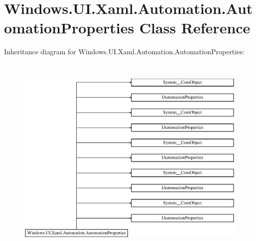 \hypertarget{class_windows_1_1_u_i_1_1_xaml_1_1_automation_1_1_automation_properties}{}\section{Windows.\+U\+I.\+Xaml.\+Automation.\+Automation\+Properties Class Reference}
\label{class_windows_1_1_u_i_1_1_xaml_1_1_automation_1_1_automation_properties}
Inheritance diagram for Windows.\+U\+I.\+Xaml.\+Automation.\+Automation\+Properties\+:\begin{figure}[H]
\begin{center}
\leavevmode
\includegraphics[height=10.032573cm]{class_windows_1_1_u_i_1_1_xaml_1_1_automation_1_1_automation_properties}
\end{center}
\end{figure}
